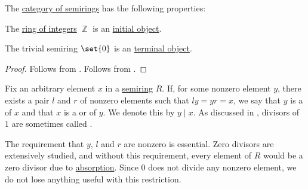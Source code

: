 \begin{proposition}\label{thm:category_of_semirings_properties}
  The \hyperref[def:semiring/category]{category of semirings} has the following properties:
  \begin{thmenum}
     The \hyperref[def:set_of_integers]{ring of integers} \( \BbbZ \) is an \hyperref[def:universal_objects/initial]{initial object}.

     The trivial semiring \( \set{ 0 } \) is an \hyperref[def:universal_objects/terminal]{terminal object}.
  \end{thmenum}
\end{proposition}
\begin{proof}
   Follows from .
   Follows from .
\end{proof}

\begin{definition}\label{def:semiring_division}\mimprovised
  Fix an arbitrary element \( x \) in a \hyperref[def:semiring]{semiring} \( R \). If, for some nonzero element \( y \), there exists a pair \( l \) and \( r \) of nonzero elements such that \( l y = y r = x \), we say that \( y \) is a  of \( x \) and that \( x \) is a  or  of \( y \). We denote this by \( y \mid x \). As discussed in , divisors of \( 1 \) are sometimes called .

  The requirement that \( y \), \( l \) and \( r \) are nonzero is essential. Zero divisors are extensively studied, and without this requirement, every element of \( R \) would be a zero divisor due to \hyperref[def:semiring/absorption]{absorption}. Since \( 0 \) does not divide any nonzero element, we do not lose anything useful with this restriction.
\end{definition}

